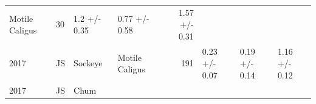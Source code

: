 \documentclass[fleqn,10pt]{wlpeerj} %
\begin{document}
\begin{longtable}[]{@{}llllrlll@{}}
\begin{minipage}[t]{0.11\columnwidth}
Motile Caligus\strut
\end{minipage} & \begin{minipage}[t]{0.04\columnwidth}\raggedleft\strut
30\strut
\end{minipage} & \begin{minipage}[t]{0.14\columnwidth}\raggedright\strut
1.2 +/- 0.35\strut
\end{minipage} & \begin{minipage}[t]{0.14\columnwidth}\raggedright\strut
0.77 +/- 0.58\strut
\end{minipage} & \begin{minipage}[t]{0.14\columnwidth}\raggedright\strut
1.57 +/- 0.31\strut
\end{minipage}\tabularnewline
\begin{minipage}[t]{0.09\columnwidth}\raggedright\strut
2017\strut
\end{minipage} & \begin{minipage}[t]{0.06\columnwidth}\raggedright\strut
JS\strut
\end{minipage} & \begin{minipage}[t]{0.06\columnwidth}\raggedright\strut
Sockeye\strut
\end{minipage} & \begin{minipage}[t]{0.11\columnwidth}\raggedright\strut
Motile Caligus\strut
\end{minipage} & \begin{minipage}[t]{0.04\columnwidth}\raggedleft\strut
191\strut
\end{minipage} & \begin{minipage}[t]{0.14\columnwidth}\raggedright\strut
0.23 +/- 0.07\strut
\end{minipage} & \begin{minipage}[t]{0.14\columnwidth}\raggedright\strut
0.19 +/- 0.14\strut
\end{minipage} & \begin{minipage}[t]{0.14\columnwidth}\raggedright\strut
1.16 +/- 0.12\strut
\end{minipage}\tabularnewline
\begin{minipage}[t]{0.09\columnwidth}\raggedright\strut
2017\strut
\end{minipage} & \begin{minipage}[t]{0.06\columnwidth}\raggedright\strut
JS\strut
\end{minipage} & \begin{minipage}[t]{0.06\columnwidth}\raggedright\strut
Chum\strut
\end{minipage} & \begin{minipage}[t]{0.11\columnwidth}\raggedright\strut

\end{minipage}
\end{longtable}
\end{document}
